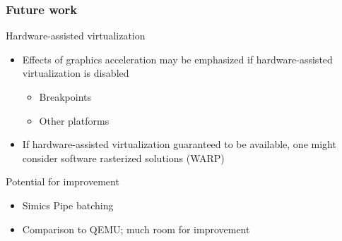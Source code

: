 
\begin{frame}

\frametitle{Future work}

\begin{block}{Hardware-assisted virtualization}
	\begin{itemize}
		\item Effects of graphics acceleration may be emphasized if hardware-assisted virtualization is disabled
		\begin{itemize}
			\item Breakpoints
			\item Other platforms
		\end{itemize}
		\item If hardware-assisted virtualization guaranteed to be available, one might consider software rasterized solutions (WARP)
	\end{itemize}
\end{block}

\begin{block}{Potential for improvement}
	\begin{itemize}
		\item Simics Pipe batching
		\item Comparison to QEMU; much room for improvement
	\end{itemize}
\end{block}

\end{frame}
